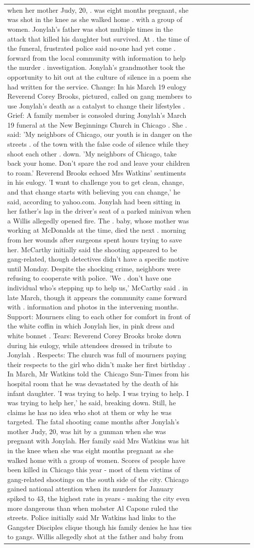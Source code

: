 \begin{table}[H]
\begin{tabular}{lllrlllll}
when her mother Judy, 20, . was eight months pregnant, she was shot in the knee as she walked home . with a group of women. Jonylah's father was shot multiple times in the attack that killed his daughter but survived. At . the time of the funeral, frustrated police said no-one had yet come . forward from the local community with information to help the murder . investigation. Jonylah's grandmother took the opportunity to hit out at the culture of silence in a poem she had written for the service. Change: In his March 19 eulogy Reverend Corey Brooks, pictured, called on gang members to use Jonylah's death as a catalyst to change their lifestyles . Grief: A family member is consoled during Jonylah's March 19 funeral at the New Beginnings Church in Chicago . She . said: 'My neighbors of Chicago, our youth is in danger on the streets . of the town with the false code of silence while they shoot each other . down. 'My neighbors of Chicago, take back your home. Don't spare the rod and leave your children to roam.' Reverend Brooks echoed Mrs Watkins' sentiments in his eulogy. 'I want to challenge you to get clean, change, and that change starts with believing you can change,' he said, according to yahoo.com. Jonylah had been sitting in her father's lap in the driver's seat of a parked minivan when a Willis allegedly opened fire. The . baby, whose mother was working at McDonalds at the time, died the next . morning from her wounds after surgeons spent hours trying to save her. McCarthy initially said the shooting appeared to be gang-related, though detectives didn't have a specific motive until Monday. Despite the shocking crime, neighbors were refusing to cooperate with police. 'We . don't have one individual who's stepping up to help us,' McCarthy said . in late March, though it appears the community came forward with . information and photos in the intervening months. Support: Mourners cling to each other for comfort in front of the white coffin in which Jonylah lies, in pink dress and white bonnet . Tears: Reverend Corey Brooks broke down during his eulogy, while attendees dressed in tribute to Jonylah . Respects: The church was full of mourners paying their respects to the girl who didn't make her first birthday . In March, Mr Watkins told the Chicago Sun-Times from his hospital room that he was devastated by the death of his infant daughter. 'I was trying to help. I was trying to help. I was trying to help her,' he said, breaking down. Still, he claims he has no idea who shot at them or why he was targeted. The fatal shooting came months after Jonylah's mother Judy, 20, was hit by a gunman when she was pregnant with Jonylah. Her family said Mrs Watkins was hit in the knee when she was eight months pregnant as she walked home with a group of women. Scores of people have been killed in Chicago this year - most of them victims of gang-related shootings on the south side of the city. Chicago gained national attention when its murders for January spiked to 43, the highest rate in years - making the city even more dangerous than when mobster Al Capone ruled the streets. Police initially said Mr Watkins had links to the Gangster Disciples clique though his family denies he has ties to gangs. Willis allegedly shot at the father and baby from 
\end{tabular}
\end{table}
